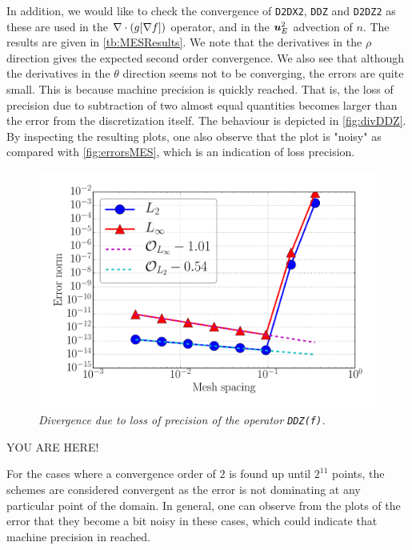 In addition, we would like to check the convergence of \texttt{D2DX2}, \texttt{DDZ} and \texttt{D2DZ2} as these are used in the $\nabla\cdot\left(g[\nabla f]\right)$ operator, and in the $\boldsymbol{u}_E^2$ advection of $n$.
The results are given in \cref{tb:MESResults}.
We note that the derivatives in the $\rho$ direction gives the expected second order convergence.
We also see that although the derivatives in the $\theta$ direction seems not to be converging, the errors are quite small.
This is because machine precision is quickly reached.
That is, the loss of precision due to subtraction of two almost equal quantities becomes larger than the error from the discretization itself.
The behaviour is depicted in \cref{fig:divDDZ}.
By inspecting the resulting plots, one also observe that the plot is "noisy" as compared with \cref{fig:errorsMES}, which is an indication of loss precision.
%
\begin{figure}[htb]
    \centering
    \includegraphics[width=1.0\textwidth]{fig/divDDZ}
    \caption{\textit{
            Divergence due to loss of precision of the operator \texttt{DDZ(f)}.
        }}
    \label{fig:flatBC}
\end{figure}
%

YOU ARE HERE!

For the cases where a convergence order of $2$ is found up until $2^{11}$ points, the schemes are considered convergent as the error is not dominating at any particular point of the domain.
In general, one can observe from the plots of the error that they become a bit noisy in these cases, which could indicate that machine precision in reached.

